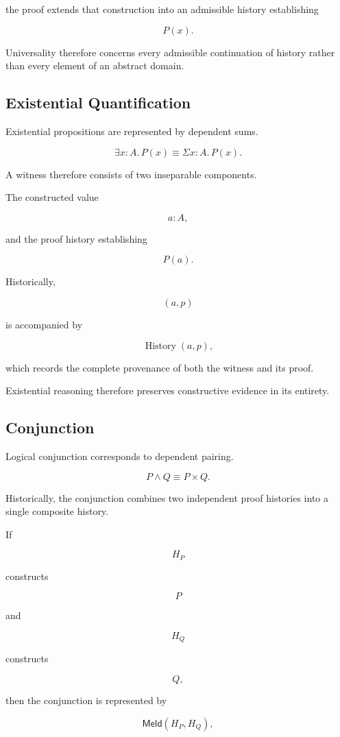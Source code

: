 \documentclass[12pt,oneside]{article}
\theoremstyle{definition}
\theoremstyle{remark}
\newcommand{\Meld}{\mathsf{Meld}}
\DeclareMathOperator{\History}{History}
\begin{document}
the proof extends that construction into an admissible history establishing

\[
P(x).
\]

Universality therefore concerns every admissible continuation of history rather
than every element of an abstract domain.

\subsection{Existential Quantification}

Existential propositions are represented by dependent sums.

\[
\exists x:A.\,P(x)
\equiv
\Sigma x:A.\,P(x).
\]

A witness therefore consists of two inseparable components.

The constructed value

\[
a:A,
\]

and the proof history establishing

\[
P(a).
\]

Historically,

\[
(a,p)
\]

is accompanied by

\[
\History(a,p),
\]

which records the complete provenance of both the witness and its proof.

Existential reasoning therefore preserves constructive evidence in its entirety.

\subsection{Conjunction}

Logical conjunction corresponds to dependent pairing.

\[
P
\land
Q
\equiv
P
\times
Q.
\]

Historically, the conjunction combines two independent proof histories into a
single composite history.

If

\[
H_P
\]

constructs

\[
P
\]

and

\[
H_Q
\]

constructs

\[
Q,
\]

then the conjunction is represented by

\[
\Meld(H_P,H_Q),
\]
\end{document}
